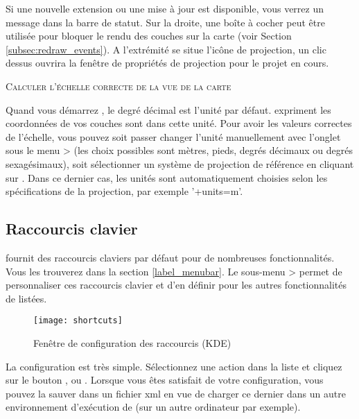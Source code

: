 Si une nouvelle extension ou une mise à jour est disponible, vous verrez un message dans la barre de statut. Sur la droite, une boîte à cocher peut être utilisée pour bloquer le rendu des couches sur la carte (voir Section \ref{subsec:redraw_events}). A l'extrémité se situe l'icône de projection,  un clic dessus ouvrira la fenêtre de propriétés de projection pour le projet en cours.

\begin{Tip} \caption{\textsc{Calculer l'échelle correcte de la vue de la carte}} 
Quand vous démarrez \qg, le degré décimal est l'unité par défaut. \qg expriment les coordonnées de vos couches sont dans cette unité. Pour avoir les valeurs correctes de l'échelle, vous pouvez soit passer changer l'unité manuellement avec l'onglet  sous le menu  > (les choix possibles sont mètres, pieds, degrés décimaux ou degrés sexagésimaux), soit sélectionner un système de projection de référence en cliquant sur . Dans ce dernier cas, les unités sont automatiquement choisies selon les spécifications de la projection, par exemple '+units=m'.
\end{Tip}

\subsection{Raccourcis clavier} \label{shortcuts}

\qg fournit des raccourcis claviers par défaut pour de nombreuses fonctionnalités. Vous les trouverez dans la section \ref{label_menubar}. Le sous-menu  >  permet de personnaliser ces raccourcis clavier et d'en définir pour les autres fonctionnalités de \qg listées.  

\begin{figure}[ht]
   \centering
   \texttt{[image: shortcuts]}
   \caption{Fenêtre de configuration des raccourcis \nixcaption (KDE)} \label{fig:shortcuts}
\end{figure}

La configuration est très simple. Sélectionnez une action dans la liste et cliquez sur le bouton ,  ou . Lorsque vous êtes satisfait de votre configuration, vous pouvez la sauver dans un fichier xml en vue de  charger ce dernier dans un autre environnement d'exécution de \qg (sur un autre ordinateur par exemple). 

